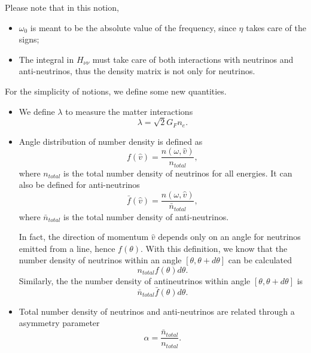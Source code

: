 Please note that in this notion,
\begin{itemize}
    \item $\omega_0$ is meant to be the absolute value of the frequency, since $\eta$ takes care of the signs;
\item The integral in $H_{\nu\nu}$ must take care of both interactions with neutrinos and anti-neutrinos, thus the density matrix is not only for neutrinos.
\end{itemize}

For the simplicity of notions, we define some new quantities.
\begin{itemize}
    \item We define $\lambda$ to measure the matter interactions
    \begin{equation}
        \lambda = \sqrt{2} G_F n_e.
    \end{equation}
\item Angle distribution of number density is defined as
\begin{equation}
    f(\hat v) = \frac{n(\omega,\hat v)}{n_{total}},
\end{equation}
   where $n_{total}$ is the total number density of neutrinos for all energies. It can also be defined for anti-neutrinos
\begin{equation}
      \bar f(\hat v) = \frac{n(\omega,\hat v)}{\bar n_{total}},
\end{equation}
   where $\bar n_{total}$ is the total number density of anti-neutrinos.

   In fact, the direction of momentum $\hat v$ depends only on an angle for neutrinos emitted from a line, hence $f(\theta)$. With this definition, we know that the number density of neutrinos within an angle $[\theta, \theta + d\theta]$ can be calculated
\begin{equation}
      n_{total} f(\theta) d\theta.
\end{equation}
   Similarly, the the number density of antineutrinos within angle $[\theta, \theta+d\theta]$ is
\begin{equation}
    \bar n_{total} \bar f(\theta) d\theta.
\end{equation}
\item Total number density of neutrinos and anti-neutrinos are related through a asymmetry parameter
\begin{equation}
    \alpha = \frac{\bar n_{total} }{n_{total}}.
\end{equation}
      
\end{itemize}

